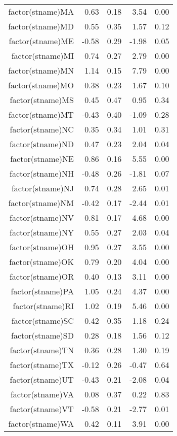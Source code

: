 \begin{table}[ht]
\begin{tabular}{rrrrr}
  factor(stname)MA & 0.63 & 0.18 & 3.54 & 0.00 \\ 
  factor(stname)MD & 0.55 & 0.35 & 1.57 & 0.12 \\ 
  factor(stname)ME & -0.58 & 0.29 & -1.98 & 0.05 \\ 
  factor(stname)MI & 0.74 & 0.27 & 2.79 & 0.00 \\ 
  factor(stname)MN & 1.14 & 0.15 & 7.79 & 0.00 \\ 
  factor(stname)MO & 0.38 & 0.23 & 1.67 & 0.10 \\ 
  factor(stname)MS & 0.45 & 0.47 & 0.95 & 0.34 \\ 
  factor(stname)MT & -0.43 & 0.40 & -1.09 & 0.28 \\ 
  factor(stname)NC & 0.35 & 0.34 & 1.01 & 0.31 \\ 
  factor(stname)ND & 0.47 & 0.23 & 2.04 & 0.04 \\ 
  factor(stname)NE & 0.86 & 0.16 & 5.55 & 0.00 \\ 
  factor(stname)NH & -0.48 & 0.26 & -1.81 & 0.07 \\ 
  factor(stname)NJ & 0.74 & 0.28 & 2.65 & 0.01 \\ 
  factor(stname)NM & -0.42 & 0.17 & -2.44 & 0.01 \\ 
  factor(stname)NV & 0.81 & 0.17 & 4.68 & 0.00 \\ 
  factor(stname)NY & 0.55 & 0.27 & 2.03 & 0.04 \\ 
  factor(stname)OH & 0.95 & 0.27 & 3.55 & 0.00 \\ 
  factor(stname)OK & 0.79 & 0.20 & 4.04 & 0.00 \\ 
  factor(stname)OR & 0.40 & 0.13 & 3.11 & 0.00 \\ 
  factor(stname)PA & 1.05 & 0.24 & 4.37 & 0.00 \\ 
  factor(stname)RI & 1.02 & 0.19 & 5.46 & 0.00 \\ 
  factor(stname)SC & 0.42 & 0.35 & 1.18 & 0.24 \\ 
  factor(stname)SD & 0.28 & 0.18 & 1.56 & 0.12 \\ 
  factor(stname)TN & 0.36 & 0.28 & 1.30 & 0.19 \\ 
  factor(stname)TX & -0.12 & 0.26 & -0.47 & 0.64 \\ 
  factor(stname)UT & -0.43 & 0.21 & -2.08 & 0.04 \\ 
  factor(stname)VA & 0.08 & 0.37 & 0.22 & 0.83 \\ 
  factor(stname)VT & -0.58 & 0.21 & -2.77 & 0.01 \\ 
  factor(stname)WA & 0.42 & 0.11 & 3.91 & 0.00 \\ 

\end{tabular}
\end{table}
